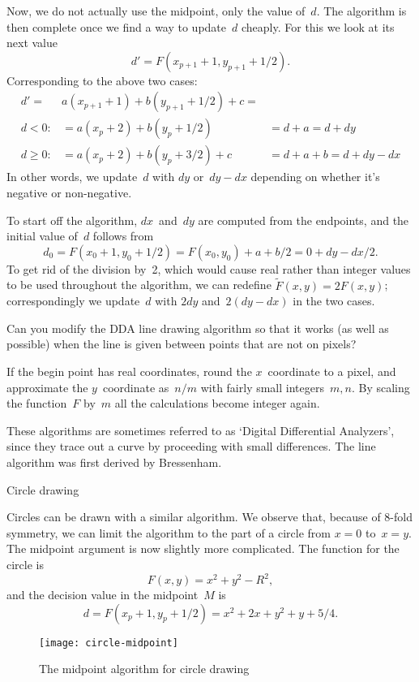 Now, we do not actually use the midpoint, only the value of~$d$.
The algorithm is then complete once we find a way to update~$d$ cheaply.
For this we look at its next value
\[ d'=F(x_{p+1}+1,y_{p+1}+1/2). \]
Corresponding to the above two cases:
\[ \begin{array}{rll}
    d'=&a(x_{p+1}+1)+b(y_{p+1}+1/2)+c=\\
    d<0:&= a(x_p+2)+b(y_p+1/2)&=d+a=d+dy\\
    d\geq0:&= a(x_p+2)+b(y_p+3/2)+c&=d+a+b=d+dy-dx
\end{array} \]
In other words, we update~$d$ with $dy$ or~$dy-dx$ depending on
whether it's negative or non-negative.

To start off the algorithm, $dx$~and~$dy$ are computed from the
endpoints, and the initial value of~$d$ follows from
\[ d_0=F(x_0+1,y_0+1/2)=F(x_0,y_0)+a+b/2=0+dy-dx/2.\]
To get rid of the division by~2, which would cause real rather than
integer values to be used throughout the algorithm,
we can redefine $\tilde
F(x,y)=2F(x,y)$; correspondingly we update~$d$ with $2dy$
and~$2(dy-dx)$ in the two cases.
\begin{594exercise}
Can you modify the DDA line drawing algorithm so that it works (as
well as possible) when the line is given between points that are not
on pixels?
\end{594exercise}
\begin{answer}
If the begin point has real coordinates, round the $x$~coordinate to a
pixel, and approximate the $y$~coordinate as~$n/m$ with fairly small
integers~$m,n$. By scaling the function~$F$ by~$m$ all the
calculations become integer again.
\end{answer}

These algorithms are sometimes referred to as `Digital
Differential Analyzers', since they trace out a curve by proceeding
with small differences. The line algorithm was first derived by Bressenham.

 {Circle drawing}

Circles can be drawn with a similar algorithm. We observe that,
because of 8-fold symmetry, we can limit the algorithm to the part of
a circle from $x=0$ to~$x=y$. The midpoint argument is now slightly
more complicated. The function for the circle is 
\[ F(x,y) = x^2+y^2-R^2,\]
and the decision value in the midpoint~$M$ is 
\[ d=F(x_p+1,y_p+1/2)=x^2+2x+y^2+y+5/4. \]

\begin{figure}
\texttt{[image: circle-midpoint]}
\caption{The midpoint algorithm for circle drawing}
\end{figure}

